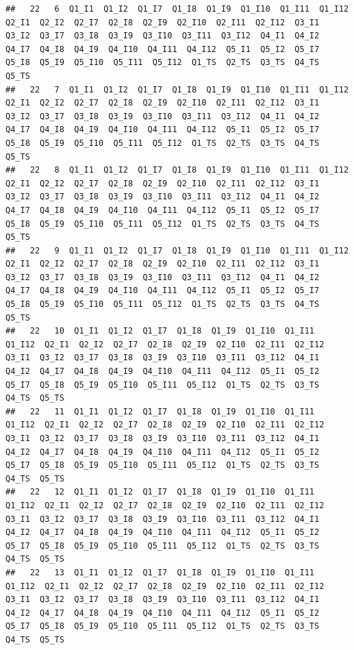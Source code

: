 \documentclass[
]{book}
\begin{document}
\begin{verbatim}
##   22   6  Q1_I1  Q1_I2  Q1_I7  Q1_I8  Q1_I9  Q1_I10  Q1_I11  Q1_I12  Q2_I1  Q2_I2  Q2_I7  Q2_I8  Q2_I9  Q2_I10  Q2_I11  Q2_I12  Q3_I1  Q3_I2  Q3_I7  Q3_I8  Q3_I9  Q3_I10  Q3_I11  Q3_I12  Q4_I1  Q4_I2  Q4_I7  Q4_I8  Q4_I9  Q4_I10  Q4_I11  Q4_I12  Q5_I1  Q5_I2  Q5_I7  Q5_I8  Q5_I9  Q5_I10  Q5_I11  Q5_I12  Q1_TS  Q2_TS  Q3_TS  Q4_TS  Q5_TS
##   22   7  Q1_I1  Q1_I2  Q1_I7  Q1_I8  Q1_I9  Q1_I10  Q1_I11  Q1_I12  Q2_I1  Q2_I2  Q2_I7  Q2_I8  Q2_I9  Q2_I10  Q2_I11  Q2_I12  Q3_I1  Q3_I2  Q3_I7  Q3_I8  Q3_I9  Q3_I10  Q3_I11  Q3_I12  Q4_I1  Q4_I2  Q4_I7  Q4_I8  Q4_I9  Q4_I10  Q4_I11  Q4_I12  Q5_I1  Q5_I2  Q5_I7  Q5_I8  Q5_I9  Q5_I10  Q5_I11  Q5_I12  Q1_TS  Q2_TS  Q3_TS  Q4_TS  Q5_TS
##   22   8  Q1_I1  Q1_I2  Q1_I7  Q1_I8  Q1_I9  Q1_I10  Q1_I11  Q1_I12  Q2_I1  Q2_I2  Q2_I7  Q2_I8  Q2_I9  Q2_I10  Q2_I11  Q2_I12  Q3_I1  Q3_I2  Q3_I7  Q3_I8  Q3_I9  Q3_I10  Q3_I11  Q3_I12  Q4_I1  Q4_I2  Q4_I7  Q4_I8  Q4_I9  Q4_I10  Q4_I11  Q4_I12  Q5_I1  Q5_I2  Q5_I7  Q5_I8  Q5_I9  Q5_I10  Q5_I11  Q5_I12  Q1_TS  Q2_TS  Q3_TS  Q4_TS  Q5_TS
##   22   9  Q1_I1  Q1_I2  Q1_I7  Q1_I8  Q1_I9  Q1_I10  Q1_I11  Q1_I12  Q2_I1  Q2_I2  Q2_I7  Q2_I8  Q2_I9  Q2_I10  Q2_I11  Q2_I12  Q3_I1  Q3_I2  Q3_I7  Q3_I8  Q3_I9  Q3_I10  Q3_I11  Q3_I12  Q4_I1  Q4_I2  Q4_I7  Q4_I8  Q4_I9  Q4_I10  Q4_I11  Q4_I12  Q5_I1  Q5_I2  Q5_I7  Q5_I8  Q5_I9  Q5_I10  Q5_I11  Q5_I12  Q1_TS  Q2_TS  Q3_TS  Q4_TS  Q5_TS
##   22   10  Q1_I1  Q1_I2  Q1_I7  Q1_I8  Q1_I9  Q1_I10  Q1_I11  Q1_I12  Q2_I1  Q2_I2  Q2_I7  Q2_I8  Q2_I9  Q2_I10  Q2_I11  Q2_I12  Q3_I1  Q3_I2  Q3_I7  Q3_I8  Q3_I9  Q3_I10  Q3_I11  Q3_I12  Q4_I1  Q4_I2  Q4_I7  Q4_I8  Q4_I9  Q4_I10  Q4_I11  Q4_I12  Q5_I1  Q5_I2  Q5_I7  Q5_I8  Q5_I9  Q5_I10  Q5_I11  Q5_I12  Q1_TS  Q2_TS  Q3_TS  Q4_TS  Q5_TS
##   22   11  Q1_I1  Q1_I2  Q1_I7  Q1_I8  Q1_I9  Q1_I10  Q1_I11  Q1_I12  Q2_I1  Q2_I2  Q2_I7  Q2_I8  Q2_I9  Q2_I10  Q2_I11  Q2_I12  Q3_I1  Q3_I2  Q3_I7  Q3_I8  Q3_I9  Q3_I10  Q3_I11  Q3_I12  Q4_I1  Q4_I2  Q4_I7  Q4_I8  Q4_I9  Q4_I10  Q4_I11  Q4_I12  Q5_I1  Q5_I2  Q5_I7  Q5_I8  Q5_I9  Q5_I10  Q5_I11  Q5_I12  Q1_TS  Q2_TS  Q3_TS  Q4_TS  Q5_TS
##   22   12  Q1_I1  Q1_I2  Q1_I7  Q1_I8  Q1_I9  Q1_I10  Q1_I11  Q1_I12  Q2_I1  Q2_I2  Q2_I7  Q2_I8  Q2_I9  Q2_I10  Q2_I11  Q2_I12  Q3_I1  Q3_I2  Q3_I7  Q3_I8  Q3_I9  Q3_I10  Q3_I11  Q3_I12  Q4_I1  Q4_I2  Q4_I7  Q4_I8  Q4_I9  Q4_I10  Q4_I11  Q4_I12  Q5_I1  Q5_I2  Q5_I7  Q5_I8  Q5_I9  Q5_I10  Q5_I11  Q5_I12  Q1_TS  Q2_TS  Q3_TS  Q4_TS  Q5_TS
##   22   13  Q1_I1  Q1_I2  Q1_I7  Q1_I8  Q1_I9  Q1_I10  Q1_I11  Q1_I12  Q2_I1  Q2_I2  Q2_I7  Q2_I8  Q2_I9  Q2_I10  Q2_I11  Q2_I12  Q3_I1  Q3_I2  Q3_I7  Q3_I8  Q3_I9  Q3_I10  Q3_I11  Q3_I12  Q4_I1  Q4_I2  Q4_I7  Q4_I8  Q4_I9  Q4_I10  Q4_I11  Q4_I12  Q5_I1  Q5_I2  Q5_I7  Q5_I8  Q5_I9  Q5_I10  Q5_I11  Q5_I12  Q1_TS  Q2_TS  Q3_TS  Q4_TS  Q5_TS

\end{verbatim}
\end{document}
